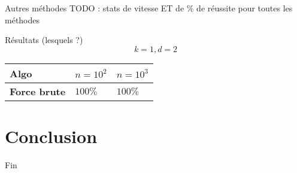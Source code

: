\documentclass{falconbeamer}
\begin{document}
\begin{frame}{Autres méthodes}
	TODO : stats de vitesse ET de \% de réussite pour toutes les méthodes
\end{frame}

\begin{frame}{Résultats (lesquels ?)}
	$$
	k=1, d=2
	$$
	\begin{center}\begin{tabular}{ |m{8em}|m{3.5em}|m{3.5em}| }
		\hline
		Algo & $n=10^2$ & $n=10^3$\\
		\hline
		\textbf{Force brute} & $100\%$ & $100\%$ \\
		\hline
	\end{tabular}\end{center}
\end{frame}

\section{Conclusion}

\begin{frame}[standout]
	Fin
\end{frame}
\end{document}
